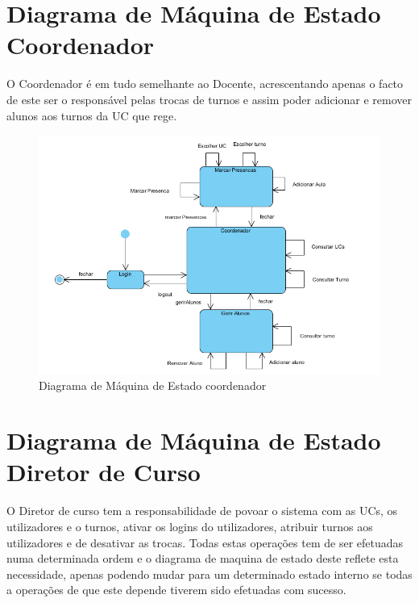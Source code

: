 \documentclass[12pt,a4paper]{report}
\begin{document}
\pagebreak
\section{Diagrama de Máquina de Estado Coordenador}
    O Coordenador é em tudo semelhante ao Docente, acrescentando apenas o facto de este ser o responsável pelas trocas de turnos e assim poder adicionar e remover alunos aos turnos da UC que rege.
   
    \begin{figure}[H]
	\centering 
	\includegraphics[width=\textwidth]{modelacao/diagramas_maq_estado/coordenador_maq_estado.png}  
	\caption{Diagrama de Máquina de Estado coordenador}
    \end{figure}

\pagebreak
\section{Diagrama de Máquina de Estado Diretor de Curso}
    O Diretor de curso tem a responsabilidade de povoar o sistema com as UCs, os utilizadores e o turnos, ativar os logins do utilizadores, atribuir turnos aos utilizadores e de desativar as trocas. Todas estas operações tem de ser efetuadas numa determinada ordem e o diagrama de maquina de estado deste reflete esta necessidade, apenas podendo mudar para um determinado estado interno se todas a operações de que este depende tiverem sido efetuadas com sucesso.
\end{document}
